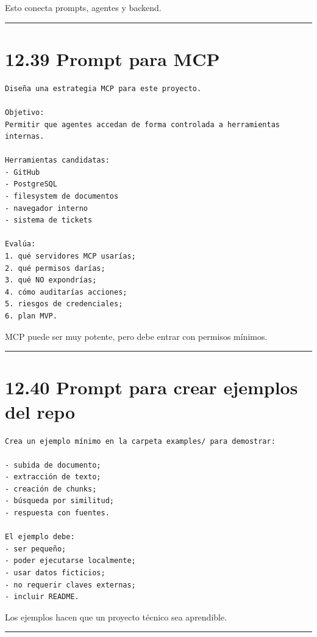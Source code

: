 Esto conecta prompts, agentes y backend.

\begin{center}\rule{0.5\linewidth}{0.5pt}\end{center}

\section{12.39 Prompt para MCP}\label{prompt-para-mcp}

\begin{lstlisting}
Diseña una estrategia MCP para este proyecto.

Objetivo:
Permitir que agentes accedan de forma controlada a herramientas internas.

Herramientas candidatas:
- GitHub
- PostgreSQL
- filesystem de documentos
- navegador interno
- sistema de tickets

Evalúa:
1. qué servidores MCP usarías;
2. qué permisos darías;
3. qué NO expondrías;
4. cómo auditarías acciones;
5. riesgos de credenciales;
6. plan MVP.
\end{lstlisting}

MCP puede ser muy potente, pero debe entrar con permisos mínimos.

\begin{center}\rule{0.5\linewidth}{0.5pt}\end{center}

\section{12.40 Prompt para crear ejemplos del
repo}\label{prompt-para-crear-ejemplos-del-repo}

\begin{lstlisting}
Crea un ejemplo mínimo en la carpeta examples/ para demostrar:

- subida de documento;
- extracción de texto;
- creación de chunks;
- búsqueda por similitud;
- respuesta con fuentes.

El ejemplo debe:
- ser pequeño;
- poder ejecutarse localmente;
- usar datos ficticios;
- no requerir claves externas;
- incluir README.
\end{lstlisting}

Los ejemplos hacen que un proyecto técnico sea aprendible.

\begin{center}\rule{0.5\linewidth}{0.5pt}\end{center}

